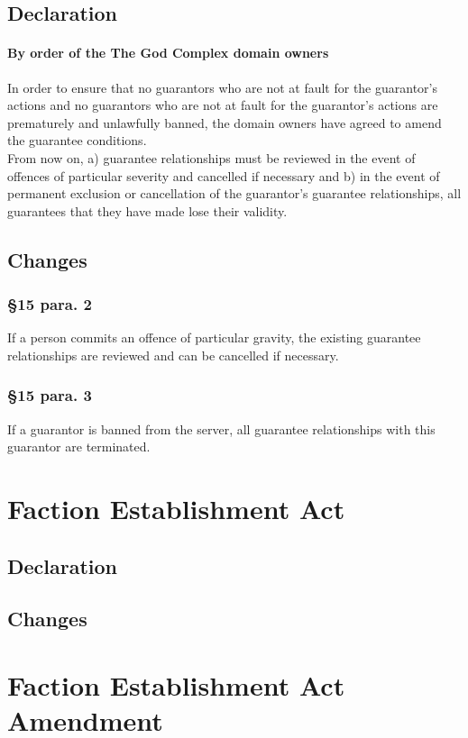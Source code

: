 \documentclass{cjs9}
\begin{document}
\subsection{Declaration}
\paragraph{By order of the The God Complex domain owners\\}
In order to ensure that no guarantors who are not at fault for the guarantor's actions and no guarantors who are not at fault for the guarantor's actions are prematurely and unlawfully banned, the domain owners have agreed to amend the guarantee conditions.
\\From now on, a) guarantee relationships must be reviewed in the event of offences of particular severity and cancelled if necessary and b) in the event of permanent exclusion or cancellation of the guarantor's guarantee relationships, all guarantees that they have made lose their validity. 
\subsection{Changes}
\subsubsection*{§15 para. 2}
If a person commits an offence of particular gravity, the existing guarantee relationships are reviewed and can be cancelled if necessary.
\subsubsection*{§15 para. 3}
If a guarantor is banned from the server, all guarantee relationships with this guarantor are terminated.
\newpage
\section{Faction Establishment Act}
\subsection{Declaration}
\subsection{Changes}
\newpage
\section{Faction Establishment Act Amendment}
\end{document}
